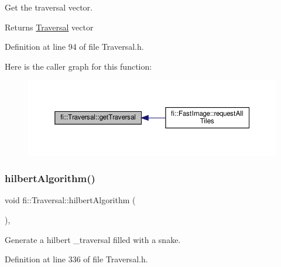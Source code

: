 Get the traversal vector. 

\begin{DoxyReturn}{Returns}
\hyperlink{classfi_1_1Traversal}{Traversal} vector 
\end{DoxyReturn}


Definition at line 94 of file Traversal.\+h.

Here is the caller graph for this function\+:
\nopagebreak
\begin{figure}[H]
\begin{center}
\leavevmode
\includegraphics[width=350pt]{d8/d0e/classfi_1_1Traversal_a5642cddfccb1e3b914615771164511f1_icgraph}
\end{center}
\end{figure}
\mbox{\label{classfi_1_1Traversal_a77545ba72aaf6831409ce8bcc399a7eb}} 
\subsubsection{\texorpdfstring{hilbert\+Algorithm()}{hilbertAlgorithm()}}
{\footnotesize\ttfamily void fi\+::\+Traversal\+::hilbert\+Algorithm (\begin{DoxyParamCaption}{ }\end{DoxyParamCaption})\hspace{0.3cm}{\ttfamily [inline]}, {\ttfamily [private]}}



Generate a hilbert \+\_\+traversal filled with a snake. 



Definition at line 336 of file Traversal.\+h.

